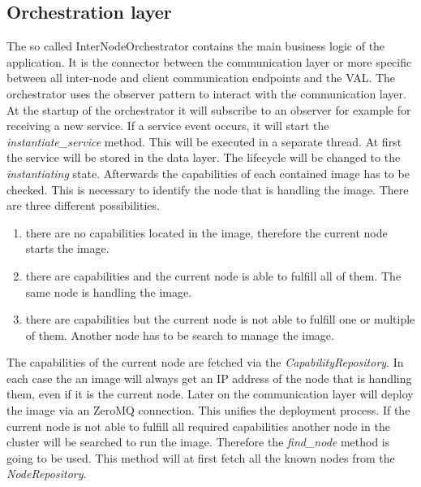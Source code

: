 \subsection{Orchestration layer}
The so called InterNodeOrchestrator contains the main business logic of the application.
It is the connector between the communication layer or more specific between all inter-node and client communication endpoints and the \ac{VAL}.
The orchestrator uses the observer pattern to interact with the communication layer.
At the startup of the orchestrator it will subscribe to an observer for example for receiving a new service.
If a service event occurs, it will start the \textit{instantiate\_service} method.
This will be executed in a separate thread.
At first the service will be stored in the data layer.
The lifecycle will be changed to the \textit{instantiating} state.
Afterwards the capabilities of each contained image has to be checked.
This is necessary to identify the node that is handling the image.
There are three different possibilities.

\begin{enumerate}
  \item there are no capabilities located in the image, therefore the current node starts the image.
  \item there are capabilities and the current node is able to fulfill all of them. The same node is handling the image.
  \item there are capabilities but the current node is not able to fulfill one or multiple of them. Another node has to be search to manage the image.
\end{enumerate}

The capabilities of the current node are fetched via the \textit{CapabilityRepository}.
In each case the an image will always get an \ac{IP} address of the node that is handling them, even if it is the current node.
Later on the communication layer will deploy the image via an ZeroMQ connection.
This unifies the deployment process.
If the current node is not able to fulfill all required capabilities another node in the cluster will be searched to run the image.
Therefore the \textit{find\_node} method is going to be used.
This method will at first fetch all the known nodes from the \textit{NodeRepository}.

